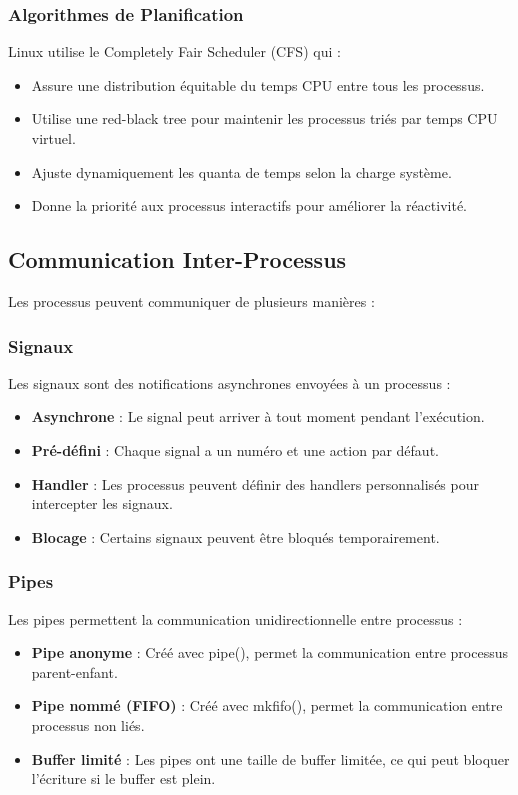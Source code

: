 \documentclass[12pt,a4paper]{article}
\begin{document}
\subsubsection{Algorithmes de Planification}
Linux utilise le Completely Fair Scheduler (CFS) qui :

\begin{itemize}
    \item Assure une distribution équitable du temps CPU entre tous les processus.
    \item Utilise une red-black tree pour maintenir les processus triés par temps CPU virtuel.
    \item Ajuste dynamiquement les quanta de temps selon la charge système.
    \item Donne la priorité aux processus interactifs pour améliorer la réactivité.
\end{itemize}

\subsection{Communication Inter-Processus}

Les processus peuvent communiquer de plusieurs manières :

\subsubsection{Signaux}
Les signaux sont des notifications asynchrones envoyées à un processus :

\begin{itemize}
    \item \textbf{Asynchrone} : Le signal peut arriver à tout moment pendant l'exécution.
    \item \textbf{Pré-défini} : Chaque signal a un numéro et une action par défaut.
    \item \textbf{Handler} : Les processus peuvent définir des handlers personnalisés pour intercepter les signaux.
    \item \textbf{Blocage} : Certains signaux peuvent être bloqués temporairement.
\end{itemize}

\subsubsection{Pipes}
Les pipes permettent la communication unidirectionnelle entre processus :

\begin{itemize}
    \item \textbf{Pipe anonyme} : Créé avec pipe(), permet la communication entre processus parent-enfant.
    \item \textbf{Pipe nommé (FIFO)} : Créé avec mkfifo(), permet la communication entre processus non liés.
    \item \textbf{Buffer limité} : Les pipes ont une taille de buffer limitée, ce qui peut bloquer l'écriture si le buffer est plein.
\end{itemize}
\end{document}
